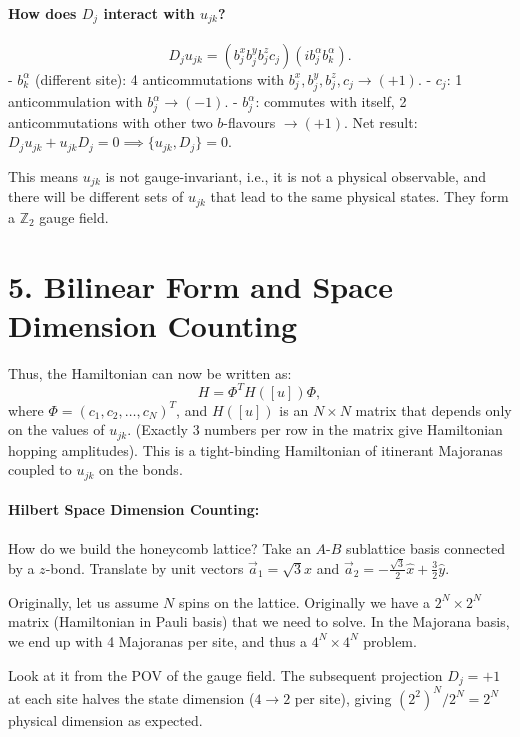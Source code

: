 \documentclass[11pt,a4paper]{article}
\begin{document}
\paragraph{How does $D_j$ interact with $u_{jk}$?}
\begin{equation}
    D_j u_{jk} = (b_j^x b_j^y b_j^z c_j) (i b_j^\alpha b_k^\alpha).
\end{equation}
- $b_k^\alpha$ (different site): 4 anticommutations with $b_j^x, b_j^y, b_j^z, c_j \to (+1)$.
- $c_j$: 1 anticommulation with $b_j^\alpha \to (-1)$.
- $b_j^\alpha$: commutes with itself, 2 anticommutations with other two $b$-flavours $\to (+1)$.
Net result: $D_j u_{jk} + u_{jk} D_j = 0 \implies \{u_{jk}, D_j\} = 0$.

This means $u_{jk}$ is not gauge-invariant, i.e., it is not a physical observable, and there will be different sets of $u_{jk}$ that lead to the same physical states. They form a $\mathbb{Z}_2$ gauge field.


\section*{5. Bilinear Form and Space Dimension Counting}

Thus, the Hamiltonian can now be written as:
\begin{equation}
    H = \Phi^T H([u]) \Phi,
\end{equation}
where $\Phi = (c_1, c_2, \dots, c_N)^T$, and $H([u])$ is an $N \times N$ matrix that depends only on the values of $u_{jk}$. (Exactly 3 numbers per row in the matrix give Hamiltonian hopping amplitudes). This is a tight-binding Hamiltonian of itinerant Majoranas coupled to $u_{jk}$ on the bonds.

\paragraph{Hilbert Space Dimension Counting:}
How do we build the honeycomb lattice? Take an $A$-$B$ sublattice basis connected by a $z$-bond. Translate by unit vectors $\vec{a}_1 = \sqrt{3}\hat{x}$ and $\vec{a}_2 = -\frac{\sqrt{3}}{2}\hat{x} + \frac{3}{2}\hat{y}$.

Originally, let us assume $N$ spins on the lattice.
Originally we have a $2^N \times 2^N$ matrix (Hamiltonian in Pauli basis) that we need to solve.
In the Majorana basis, we end up with 4 Majoranas per site, and thus a $4^N \times 4^N$ problem.

Look at it from the POV of the gauge field. The subsequent projection $D_j = +1$ at each site halves the state dimension ($4 \to 2$ per site), giving $(2^2)^N / 2^N = 2^N$ physical dimension as expected.
\end{document}
